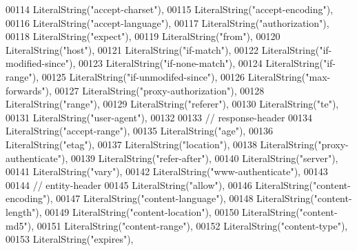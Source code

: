 \begin{DoxyCode}
00114         LiteralString(\textcolor{stringliteral}{"accept-charset"}),
00115         LiteralString(\textcolor{stringliteral}{"accept-encoding"}),
00116         LiteralString(\textcolor{stringliteral}{"accept-language"}),
00117         LiteralString(\textcolor{stringliteral}{"authorization"}),
00118         LiteralString(\textcolor{stringliteral}{"expect"}),
00119         LiteralString(\textcolor{stringliteral}{"from"}),
00120         LiteralString(\textcolor{stringliteral}{"host"}),
00121         LiteralString(\textcolor{stringliteral}{"if-match"}),
00122         LiteralString(\textcolor{stringliteral}{"if-modified-since"}),
00123         LiteralString(\textcolor{stringliteral}{"if-none-match"}),
00124         LiteralString(\textcolor{stringliteral}{"if-range"}),
00125         LiteralString(\textcolor{stringliteral}{"if-unmodifed-since"}),
00126         LiteralString(\textcolor{stringliteral}{"max-forwards"}),
00127         LiteralString(\textcolor{stringliteral}{"proxy-authorization"}),
00128         LiteralString(\textcolor{stringliteral}{"range"}),
00129         LiteralString(\textcolor{stringliteral}{"referer"}),
00130         LiteralString(\textcolor{stringliteral}{"te"}),
00131         LiteralString(\textcolor{stringliteral}{"user-agent"}),
00132 
00133         \textcolor{comment}{// response-header}
00134         LiteralString(\textcolor{stringliteral}{"accept-range"}),
00135         LiteralString(\textcolor{stringliteral}{"age"}),
00136         LiteralString(\textcolor{stringliteral}{"etag"}),
00137         LiteralString(\textcolor{stringliteral}{"location"}),
00138         LiteralString(\textcolor{stringliteral}{"proxy-authenticate"}),
00139         LiteralString(\textcolor{stringliteral}{"refer-after"}),
00140         LiteralString(\textcolor{stringliteral}{"server"}),
00141         LiteralString(\textcolor{stringliteral}{"vary"}),
00142         LiteralString(\textcolor{stringliteral}{"www-authenticate"}),
00143 
00144         \textcolor{comment}{// entity-header}
00145         LiteralString(\textcolor{stringliteral}{"allow"}),
00146         LiteralString(\textcolor{stringliteral}{"content-encoding"}),
00147         LiteralString(\textcolor{stringliteral}{"content-language"}),
00148         LiteralString(\textcolor{stringliteral}{"content-length"}),
00149         LiteralString(\textcolor{stringliteral}{"content-location"}),
00150         LiteralString(\textcolor{stringliteral}{"content-md5"}),
00151         LiteralString(\textcolor{stringliteral}{"content-range"}),
00152         LiteralString(\textcolor{stringliteral}{"content-type"}),
00153         LiteralString(\textcolor{stringliteral}{"expires"}),

\end{DoxyCode}
